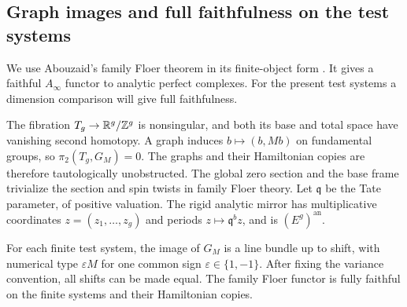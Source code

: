 \subsection{Graph images and full faithfulness on the test systems}

We use Abouzaid's family Floer theorem in its finite-object form
\cite[Theorem~2.10 and Appendix~A]{AbouzaidFaithful}.  It gives a faithful
$A_\infty$ functor to analytic perfect complexes.  For the present test
systems a dimension comparison will give full faithfulness.

The fibration $T_g\to\mathbb R^g/\mathbb Z^g$ is nonsingular, and both its base and
total space have vanishing second homotopy.  A graph induces
$b\mapsto(b,Mb)$ on fundamental groups, so
$\pi_2(T_g,G_M)=0$.  The graphs and their Hamiltonian copies are
therefore tautologically unobstructed.  The global zero section and
the base frame trivialize the section and spin twists in family Floer
theory.  Let $\mathfrak q$ be the Tate parameter, of positive valuation.
The rigid analytic mirror has multiplicative coordinates
$z=(z_1,\ldots,z_g)$ and periods $z\mapsto\mathfrak q^b z$, and is
$(E^g)^{\mathrm{an}}$.

\begin{lemma}
\label{setup:graph-images}
For each finite test system, the image of $G_M$ is a line bundle up to
shift, with numerical type $\varepsilon M$ for one common sign
$\varepsilon\in\{1,-1\}$.  After fixing the variance convention, all
shifts can be made equal.  The family Floer functor is fully faithful
on the finite systems and their Hamiltonian copies.
\end{lemma}

